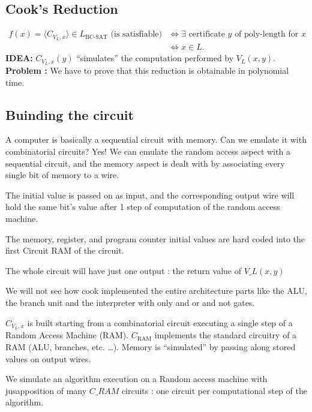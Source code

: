 
\subsection{Cook's Reduction}
\[
\begin{aligned}
f(x)=\langle C_{V_L,x}\rangle\in L_{\mathrm{BC\text{-}SAT}}\text{ (is satisfiable)}
&\Longleftrightarrow\exists\text{ certificate }y\text{ of poly-length for }x\\
&\Longleftrightarrow x\in L.
\end{aligned}
\]
\textbf{IDEA:} $C_{V_L,x}(y)$ ``simulates'' the computation performed by $V_L(x,y)$.
\textbf{Problem : } We have to prove that this reduction is obtainable in polynomial time. 

\subsection{Buinding the circuit}
A computer is basically a sequential circuit with memory. Can we emulate it with combinatorial circuits? Yes! We can emulate the random access aspect with a sequential circuit, and the memory aspect is dealt with by associating every single bit of memory to a wire. 

The initial value is passed on as input, and the corresponding output wire will hold the same bit's value after 1 step of computation of the random access machine.

The memory, register, and program counter initial values are hard coded into the first Circuit RAM  of the circuit.

The whole circuit will have just one output : the return value of $V\_L(x,y)$ 

We will not see how cook implemented the entire architecture parts like the ALU, the branch unit and the interpreter with only and or and not gates. 


$C_{V_L,x}$ is built starting from a combinatorial circuit executing a single step of a Random Access Machine (RAM).
$C_{\mathrm{RAM}}$ implements the standard circuitry of a RAM (ALU, branches, etc. \ldots). Memory is ``simulated'' by passing along stored values on output wires.

We simulate an algorithm execution on a Random access machine with jusapposition of many $C\_RAM$ circuits : one circuit per computational step of the algorithm. 
